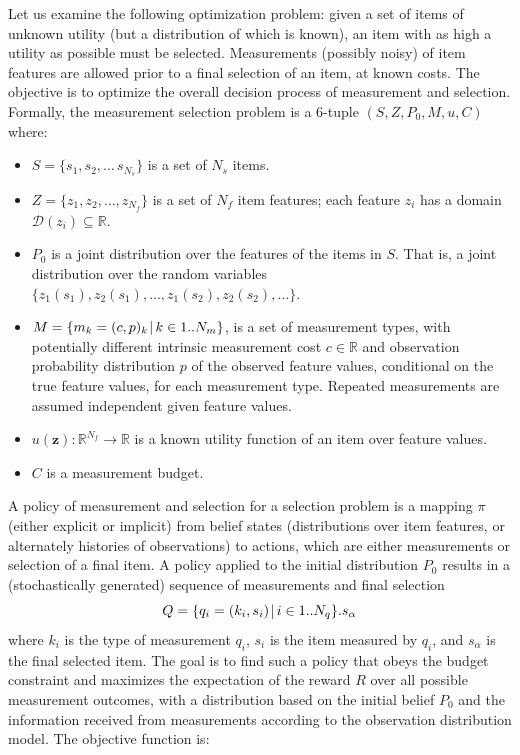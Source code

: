 Let us examine the following optimization problem:
given a set of items of unknown utility (but a
distribution of which is known), an item with as high a utility as
possible must be selected.  Measurements (possibly noisy) of item
features are allowed prior to a final selection of an item,
at known costs. The objective
is to optimize the overall decision process of measurement and
selection. Formally, the measurement selection problem is a 6-tuple
$(S, Z, P_0, M, u, C)$ where:
\begin{itemize}
\item $S=\{s_1, s_2, \ldots\, s_{N_s}\}$ is a set of $N_s$ items.
\item $Z=\{ z_1, z_2, \ldots, z_{N_f}\}$ is a set of $N_f$ item 
features; each feature
$z_i$ has a domain $\mathcal{D}(z_i)\subseteq \mathbb{R}$.
\item $P_0$ is a joint distribution over the features of the items in $S$. That is,
a joint distribution over the random
variables $\{ z_1(s_1), z_2(s_1),\ldots , z_1(s_2), z_2(s_2),\ldots\} $.
\item $M=\{m_k=(c, p)_k\:\vline\; k \in 1..N_m\}$, is a set of measurement types,
  with potentially different intrinsic measurement cost $c\in \mathbb{R}$ and
  observation probability distribution $p$ of the observed feature
  values, conditional on the true feature values, for each
  measurement type. Repeated measurements are assumed independent given feature values.
\item $u(\textbf{z})\colon\mathbb{R}^{N_f}\to \mathbb{R}$ is a known utility function of an item over feature values.
\item $C$ is a measurement budget.
\end{itemize}

A policy of measurement and selection for a selection problem is a mapping
$\pi $ (either explicit or implicit) from belief states (distributions over 
item features, or alternately histories of observations) to actions, which are
either measurements or selection of a final item. A policy applied
to the initial distribution $P_0$ results in a (stochastically generated)
sequence of measurements and final selection 
\begin{equation}
\label{eq:measurement-sequence}
Q=\{q_i=(k_i,s_i)\:\vline\;i \in 1..N_q\}.s_\alpha
\end{equation}
where $k_i$ is the type of measurement $q_i$, $s_i$ is the item
measured by $q_i$, and $s_\alpha$ is the final selected item.
The goal is to find such a policy that obeys the budget constraint and maximizes
the expectation of the reward $R$ over all possible measurement outcomes,
with a distribution based on the initial belief
$P_0$ and the information received from measurements
according to the observation distribution model. The objective function is:

